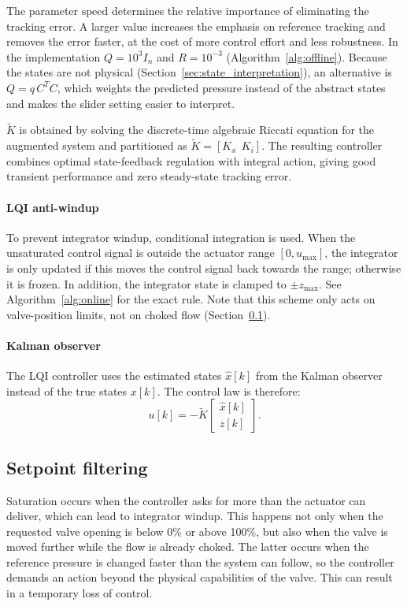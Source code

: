 \documentclass[12pt,a4paper]{article}
\begin{document}
The parameter $\text{speed}$ determines the relative importance of eliminating the tracking error. A larger value increases the emphasis on reference tracking and removes the error faster, at the cost of more control effort and less robustness. In the implementation $Q = 10^3 I_n$ and $R = 10^{-3}$ (Algorithm~\ref{alg:offline}). Because the states are not physical (Section~\ref{sec:state_interpretation}), an alternative is $Q = q\,C^T C$, which weights the predicted pressure instead of the abstract states and makes the slider setting easier to interpret.

$\tilde{K}$ is obtained by solving the discrete-time algebraic Riccati equation for the augmented system and partitioned as $\tilde{K} = [K_x \;\, K_i]$. The resulting controller combines optimal state-feedback regulation with integral action, giving good transient performance and zero steady-state tracking error.

\paragraph{LQI anti-windup}
To prevent integrator windup, conditional integration is used. When the unsaturated control signal is outside the actuator range $[0, u_{\max}]$, the integrator is only updated if this moves the control signal back towards the range; otherwise it is frozen. In addition, the integrator state is clamped to $\pm z_{\max}$. See Algorithm~\ref{alg:online} for the exact rule. Note that this scheme only acts on valve-position limits, not on choked flow (Section~\ref{sec:setpoint_filter}).

\paragraph{Kalman observer}
The LQI controller uses the estimated states $\hat{x}[k]$ from the Kalman observer instead of the true states $x[k]$. The control law is therefore:
\begin{equation}
u[k] = -\tilde{K} \begin{bmatrix} \hat{x}[k] \\ z[k] \end{bmatrix}.
\end{equation}

\subsection{Setpoint filtering}
\label{sec:setpoint_filter}
Saturation occurs when the controller asks for more than the actuator can deliver, which can lead to integrator windup. This happens not only when the requested valve opening is below 0\% or above 100\%, but also when the valve is moved further while the flow is already choked. The latter occurs when the reference pressure is changed faster than the system can follow, so the controller demands an action beyond the physical capabilities of the valve. This can result in a temporary loss of control.
\end{document}
